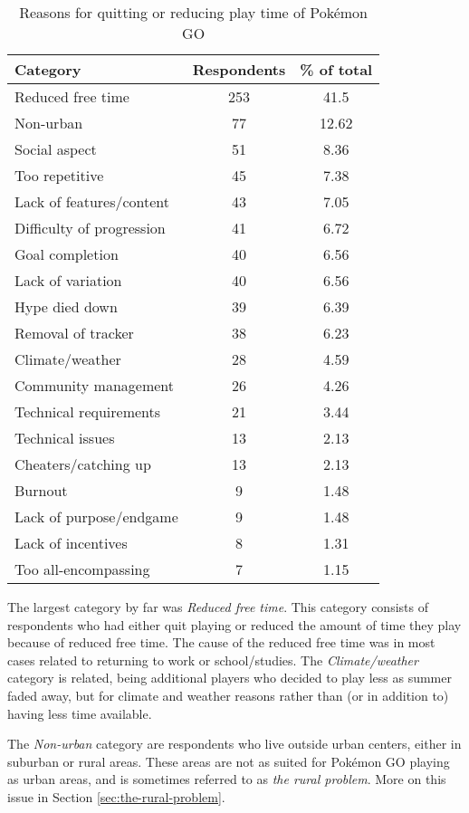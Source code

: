 \begin{table}[h]
	\centering
	\begin{tabular}{|l|c|c|}
		\hline
		\textbf{Category} & \textbf{Respondents} & \textbf{\% of total}\\
		\hline\hline
		Reduced free time & 253 & 41.5\\\hline
		Non-urban & 77 & 12.62\\\hline
		Social aspect & 51 & 8.36\\\hline
		Too repetitive & 45 & 7.38\\\hline
		Lack of features/content & 43 & 7.05\\\hline
		Difficulty of progression & 41 & 6.72\\\hline
		Goal completion & 40 & 6.56\\\hline
		Lack of variation & 40 & 6.56\\\hline
		Hype died down & 39 & 6.39\\\hline
		Removal of tracker & 38 & 6.23\\\hline
		Climate/weather & 28 & 4.59\\\hline
		Community management & 26 & 4.26\\\hline
		Technical requirements & 21 & 3.44\\\hline
		Technical issues & 13 & 2.13\\\hline
		Cheaters/catching up & 13 & 2.13\\\hline
		Burnout & 9 & 1.48\\\hline
		Lack of purpose/endgame & 9 & 1.48\\\hline
		Lack of incentives & 8 & 1.31\\\hline
		Too all-encompassing & 7 & 1.15\\\hline
	\end{tabular}
	\caption{Reasons for quitting or reducing play time of Pokémon GO}
	\label{tbl:reasons-for-quitting}
\end{table}

The largest category by far was \emph{Reduced free time}. This category consists of respondents who had either quit playing or reduced the amount of time they play because of reduced free time. The cause of the reduced free time was in most cases related to returning to work or school/studies. The \emph{Climate/weather} category is related, being additional players who decided to play less as summer faded away, but for climate and weather reasons rather than (or in addition to) having less time available.

The \emph{Non-urban} category are respondents who live outside urban centers, either in suburban or rural areas. These areas are not as suited for Pokémon GO playing as urban areas, and is sometimes referred to as \emph{the rural problem}. More on this issue in Section \ref{sec:the-rural-problem}.


